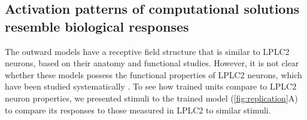 \documentclass[pdftex,9pt,lineno]{elife}
\begin{document}
\begin{figure}
\label{figsupp:sf1_outward_prevail}
\end{figure}

\subsection{Activation patterns of computational solutions resemble biological responses}

The outward models have a receptive field structure that is similar to LPLC2 neurons, based on their anatomy and functional studies. However, it is not clear whether these models possess the functional properties of LPLC2 neurons, which have been studied systematically \cite{klapoetke2017ultra,von2017feature,ache2019neural}. To see how trained units compare to LPLC2 neuron properties, we presented stimuli to the trained model (\ref{fig:replication}A) to compare its responses to those measured in LPLC2 to similar stimuli.
\end{document}
